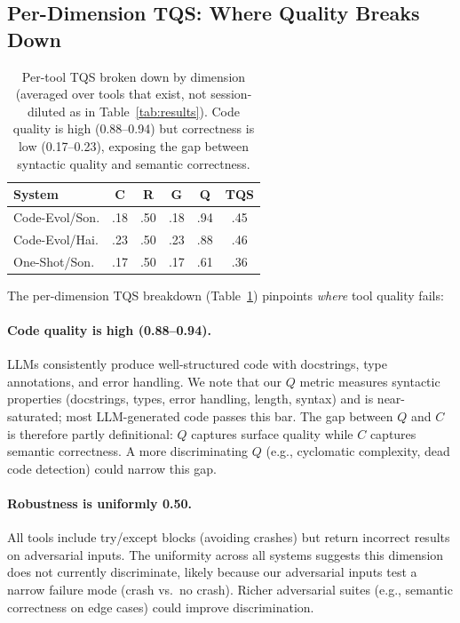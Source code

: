 \documentclass[sigplan,review,anonymous]{acmart}
\begin{document}
\subsection{Per-Dimension TQS: Where Quality Breaks Down}
\label{sec:tqs_analysis}

\begin{table}[t]
\centering
\footnotesize
\begin{tabular}{lcccc|c}
\toprule
\textbf{System} & \textbf{C} & \textbf{R} & \textbf{G} & \textbf{Q} & \textbf{TQS} \\
\midrule
Code-Evol/Son. & .18 & .50 & .18 & .94 & .45 \\
Code-Evol/Hai. & .23 & .50 & .23 & .88 & .46 \\
One-Shot/Son. & .17 & .50 & .17 & .61 & .36 \\
\bottomrule
\end{tabular}
\caption{Per-tool TQS broken down by dimension (averaged over tools that exist, not session-diluted as in Table~\ref{tab:results}). Code quality is high (0.88--0.94) but correctness is low (0.17--0.23), exposing the gap between syntactic quality and semantic correctness.}
\label{tab:tqs_dims}
\end{table}

The per-dimension TQS breakdown (Table~\ref{tab:tqs_dims}) pinpoints \emph{where} tool quality fails:

\paragraph{Code quality is high (0.88--0.94).} LLMs consistently produce well-structured code with docstrings, type annotations, and error handling. We note that our $Q$ metric measures syntactic properties (docstrings, types, error handling, length, syntax) and is near-saturated; most LLM-generated code passes this bar. The gap between $Q$ and $C$ is therefore partly definitional: $Q$ captures surface quality while $C$ captures semantic correctness. A more discriminating $Q$ (e.g., cyclomatic complexity, dead code detection) could narrow this gap.

\paragraph{Robustness is uniformly 0.50.} All tools include try/except blocks (avoiding crashes) but return incorrect results on adversarial inputs. The uniformity across all systems suggests this dimension does not currently discriminate, likely because our adversarial inputs test a narrow failure mode (crash vs.\ no crash). Richer adversarial suites (e.g., semantic correctness on edge cases) could improve discrimination.
\end{document}
